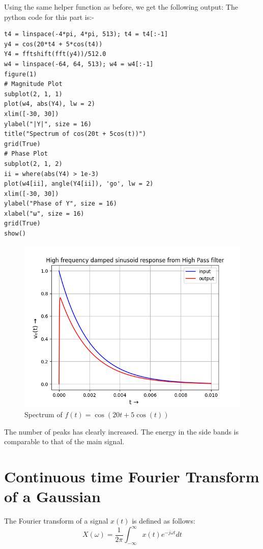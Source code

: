 \documentclass{article}
\begin{document}
Using the same helper function as before, we get the following output:\newline
The python code for this part is:-
\begin{lstlisting}
t4 = linspace(-4*pi, 4*pi, 513); t4 = t4[:-1]
y4 = cos(20*t4 + 5*cos(t4))
Y4 = fftshift(fft(y4))/512.0
w4 = linspace(-64, 64, 513); w4 = w4[:-1]
figure(1)
# Magnitude Plot
subplot(2, 1, 1)
plot(w4, abs(Y4), lw = 2)
xlim([-30, 30])
ylabel("|Y|", size = 16)
title("Spectrum of cos(20t + 5cos(t))")
grid(True)
# Phase Plot
subplot(2, 1, 2)
ii = where(abs(Y4) > 1e-3)
plot(w4[ii], angle(Y4[ii]), 'go', lw = 2)
xlim([-30, 30])
ylabel("Phase of Y", size = 16)
xlabel("ω", size = 16)
grid(True)
show()
\end{lstlisting}
\begin{figure}[h!]
\centering
\includegraphics[scale=0.6]{Figure_4.png}
\caption{Spectrum of $f(t) = \cos(20t + 5\cos(t))$}
\label{fig:universe}
\end{figure}


The number of peaks has clearly increased. The energy in the side bands is comparable to that of the main signal.



\section{Continuous time Fourier Transform of a Gaussian}
		
The Fourier transform of a signal $x(t)$ is defined as follows:\newline
\begin{equation}
X(\omega) = \frac{1}{2 \pi} \int_{- \infty}^{\infty} x(t) e^{-j \omega t} dt    
\end{equation}
\end{document}
